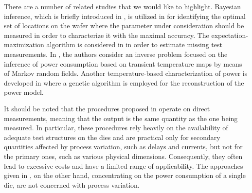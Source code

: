 There are a number of related studies that we would like to highlight. Bayesian
inference, which is briefly introduced in , is
utilized in \cite{zhang2010} for identifying the optimal set of locations on the
wafer where the parameter under consideration should be measured in order to
characterize it with the maximal accuracy. The expectation-maximization
algorithm is considered in \cite{reda2009} in order to estimate missing test
measurements. In \cite{paek2012}, the authors consider an inverse problem
focused on the inference of power consumption based on transient temperature
maps by means of Markov random fields. Another temperature-based
characterization of power is developed in \cite{mesa-martinez2007} where a
genetic algorithm is employed for the reconstruction of the power model.

It should be noted that the procedures proposed in \cite{reda2009, zhang2010}
operate on direct measurements, meaning that the output is the same quantity as
the one being measured. In particular, these procedures rely heavily on the
availability of adequate test structures on the dies and are practical only for
secondary quantities affected by process variation, such as delays and currents,
but not for the primary ones, such as various physical dimensions. Consequently,
they often lead to excessive costs and have a limited range of applicability.
The approaches given in \cite{mesa-martinez2007, paek2012}, on the other hand,
concentrating on the power consumption of a single die, are not concerned with
process variation.

